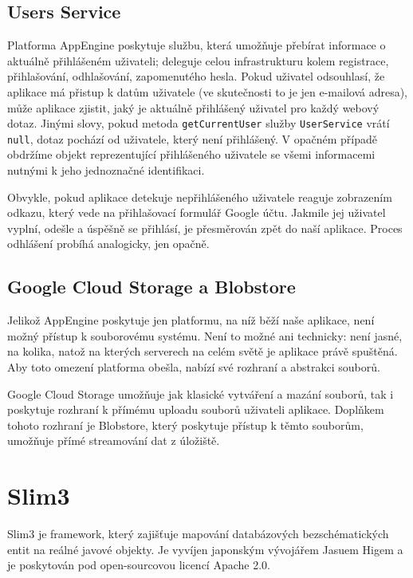 \subsection{Users Service}

Platforma AppEngine poskytuje službu, která umožňuje přebírat informace o aktuálně přihlášeném uživateli; deleguje celou infrastrukturu kolem registrace, přihlašování, odhlašování, zapomenutého hesla.
Pokud uživatel odsouhlasí, že aplikace má přistup k datům uživatele (ve skutečnosti to je jen e-mailová adresa), může aplikace zjistit, jaký je aktuálně přihlášený uživatel pro každý webový dotaz.
Jinými slovy, pokud metoda \verb|getCurrentUser| služby \verb|UserService| vrátí \verb|null|, dotaz pochází od uživatele, který není přihlášený.
V opačném případě obdržíme objekt reprezentující přihlášeného uživatele se všemi informacemi nutnými k jeho jednoznačné identifikaci.

Obvykle, pokud aplikace detekuje nepřihlášeného uživatele reaguje zobrazením odkazu, který vede na přihlašovací formulář Google účtu.
Jakmile jej uživatel vyplní,  odešle a úspěšně se přihlásí, je přesměrován zpět do naší aplikace.
Proces odhlášení probíhá analogicky, jen opačně.


\subsection{Google Cloud Storage a Blobstore}

Jelikož AppEngine poskytuje jen platformu, na níž běží naše aplikace, není možný přístup k souborovému systému.
Není to možné ani technicky: není jasné, na kolika, natož na kterých serverech na celém světě je aplikace právě spuštěná.
Aby toto omezení platforma obešla, nabízí své rozhraní a abstrakci souborů.

Google Cloud Storage umožňuje jak klasické vytváření a mazání souborů, tak i poskytuje rozhraní k přímému uploadu souborů uživateli aplikace.
Doplňkem tohoto rozhraní je Blobstore, který poskytuje přístup k těmto souborům, umožňuje přímé streamování dat z úložiště.

\section{Slim3}

Slim3 je framework, který zajišťuje mapování databázových bezschématických entit na reálné javové objekty.
Je vyvíjen japonským vývojářem Jasuem Higem a je poskytován pod open-sourcovou licencí Apache 2.0\cite{apache20}. %

